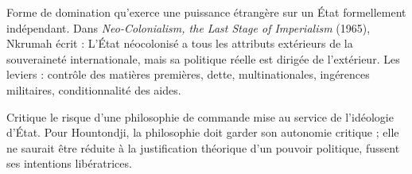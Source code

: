 \documentclass[11pt]{article}
\begin{document}
\begin{definition}
Forme de domination qu'exerce une puissance étrangère sur un État formellement indépendant. Dans \emph{Neo-Colonialism, the Last Stage of Imperialism} (1965), Nkrumah écrit : \guillemotleft L'État néocolonisé a tous les attributs extérieurs de la souveraineté internationale, mais sa politique réelle est dirigée de l'extérieur. \guillemotright Les leviers : contrôle des matières premières, dette, multinationales, ingérences militaires, conditionnalité des aides.
\end{definition}

\begin{propriete}
Critique le risque d'une \guillemotleft philosophie de commande \guillemotright mise au service de l'idéologie d'État. Pour Hountondji, la philosophie doit garder son autonomie critique ; elle ne saurait être réduite à la justification théorique d'un pouvoir politique, fussent ses intentions libératrices.
\end{propriete}
\end{document}
